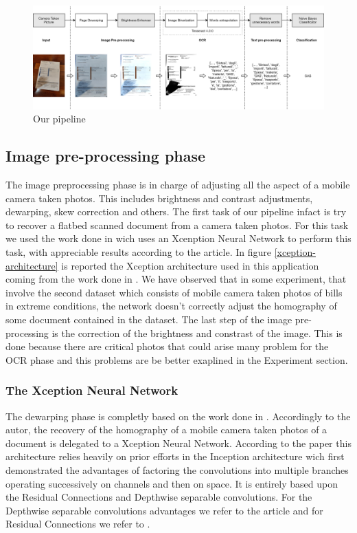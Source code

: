 \documentclass[10pt,twocolumn,letterpaper]{article}
\begin{document}
\begin{figure}[h]
  \centering
  \includegraphics[width=1.0\textwidth]{images/pipeline.png}
  \caption{Our pipeline}
  \label{fig:pipeline}
\end{figure}

\subsection{Image pre-processing phase}

The image preprocessing phase is in charge of adjusting all the aspect
of a mobile camera taken photos. This includes brightness and contrast
adjustments, dewarping, skew correction and others. The first task of
our pipeline infact is try to recover a flatbed scanned document from
a camera taken photos. For this task we used the work done in
\cite{mobile-ocr} wich uses an Xcenption Neural Network
\cite{xception_NN} to perform this task, with appreciable results
according to the article. In figure \ref{xception-architecture} is
reported the Xception architecture used in this application coming
from the work done in \cite{Improvingcamera-based}. We have observed
that in some experiment, that involve the second dataset which
consists of mobile camera taken photos of bills in extreme conditions,
the network doesn't correctly adjust the homography of some document
contained in the dataset. The last step of the image pre-processing is
the correction of the brightness and constrast of the image. This is
done because there are critical photos that could arise many problem
for the OCR phase and this problems are be better exaplined in the
Experiment section.

\subsubsection{The Xception Neural Network}

The dewarping phase is completly based on the work done in
\cite{mobile-ocr}. Accordingly to the autor, the recovery of the
homography of a mobile camera taken photos of a document is delegated
to a Xception Neural Network. According to the paper \cite{xception}
this architecture relies heavily on prior efforts in the Inception
architecture wich first demonstrated the advantages of factoring the
convolutions into multiple branches operating successively on channels
and then on space. It is entirely based upon the Residual Connections
and Depthwise separable convolutions. For the Depthwise separable
convolutions advantages we refer to the article
\cite{https://towardsdatascience.com/a-basic-introduction-to-separable-convolutions-b99ec3102728}
and for Residual Connections we refer to
\cite{https://towardsdatascience.com/residual-blocks-building-blocks-of-resnet-fd90ca15d6ec}.
\end{document}
